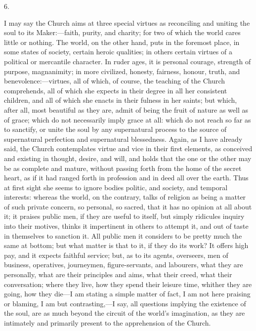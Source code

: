 6.

I may say the Church aims at three special virtues as reconciling
and uniting the soul to its Maker:—faith, purity, and charity; for
two of which the world cares little or nothing. The world, on the
other hand, puts in the foremost place, in some states of society,
certain heroic qualities; in others certain virtues of a political or
mercantile character. In ruder ages, it is personal courage, strength
of purpose, magnanimity; in more civilized, honesty, fairness, honour,
truth, and benevolence:—virtues, all of which, of course, the
teaching of the Church comprehends, all of which she expects in their
degree in all her consistent children, and all of which she enacts in
their fulness in her saints; but which, after all, most beautiful as
they are, admit of being the fruit of nature as well as of grace;
which do not necessarily imply grace at all: which do not reach so far
as to sanctify, or unite the soul by any supernatural process to the
source of supernatural perfection and supernatural blessedness. Again,
as I have already said, the Church contemplates virtue and vice in
their first elements, as conceived and existing in thought, desire,
and will, and holds that the one or the other may be as complete and
mature, without passing forth from the home of the secret heart, as if
it had ranged forth in profession and in deed all over the earth. Thus
at first sight she seems to ignore bodies politic, and society, and
temporal interests: whereas the world, on the contrary, talks of
religion as being a matter of such private concern, so personal, so
sacred, that it has no opinion at all about it; it praises public men,
if they are useful to itself, but simply ridicules inquiry into their
motives, thinks it impertinent in others to attempt it, and out of
taste in themselves to sanction it. All public men it considers to be
pretty much the same at bottom; but what matter is that to it, if they
do its work? It offers high pay, and it expects faithful service; but,
as to its agents, overseers, men of business, operatives, journeymen,
figure-servants, and labourers, what they are personally, what are
their principles and aims, what their creed, what their conversation;
where they live, how they spend their leisure time, whither they are
going, how they die—I am stating a simple matter of fact, I am not
here praising or blaming, I am but contrasting,—I say, all questions
implying the existence of the soul, are as much beyond the circuit of
the world's imagination, as they are intimately and primarily present
to the apprehension of the Church.

